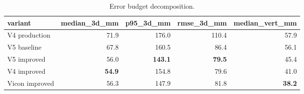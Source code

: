 \begin{table}[t]
\centering
\caption{Error budget decomposition.}
\label{tab:error_budget}
\begin{tabular}{lrrrr}
\hline
variant & median\_3d\_mm & p95\_3d\_mm & rmse\_3d\_mm & median\_vert\_mm \\
\hline
V4 production & 71.9 & 176.0 & 110.4 & 57.9 \\
V5 baseline & 67.8 & 160.5 & 86.4 & 56.1 \\
V5 improved & 56.0 & \textbf{143.1} & \textbf{79.5} & 45.4 \\
V4 improved & \textbf{54.9} & 154.8 & 79.6 & 41.0 \\
Vicon improved & 56.3 & 147.9 & 81.8 & \textbf{38.2} \\
\hline
\end{tabular}
\end{table}
